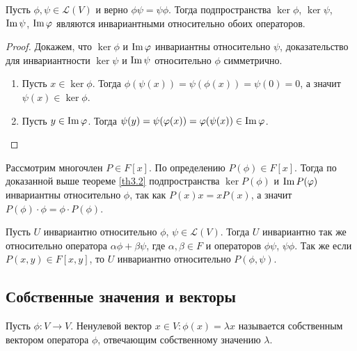 \begin{theorem}
    \label{th3.2}
    Пусть $\phi, \psi \in \mathcal{L}(V)$ и верно $\phi \psi = \psi \phi$. Тогда подпространства 
    $\ker \phi$, $\ker \psi$, $\operatorname{Im} \psi$, $\operatorname{Im} \varphi$ являются инвариантными 
    относительно обоих операторов.
\end{theorem}

\begin{proof}
    Докажем, что $\ker \phi$ и $\operatorname{Im} \varphi$ инвариантны относительно $\psi$, доказательство для 
    инвариантности $\ker \psi$ и $\operatorname{Im} \psi$ относительно $\phi$ симметрично.
    \begin{enumerate}
        \item Пусть $x \in \ker \phi$. Тогда $\phi(\psi(x)) = \psi(\phi(x)) = \psi(0) = 0$, 
        а значит $\psi(x) \in \ker \phi$.
        \item Пусть $y \in \operatorname{Im} \varphi$. Тогда $\psi(y) = \psi(\varphi(x)) = \varphi(\psi(x)) \in \operatorname{Im} \varphi$.
    \end{enumerate}
\end{proof}

\begin{note}
    Рассмотрим многочлен $P \in F[x]$. По определению $P(\phi) \in F[x]$. 
    Тогда по доказанной выше теореме \ref{th3.2} подпространства $\ker P(\phi)$ и $\operatorname{Im} P(\varphi)$ 
    инвариантны относительно $\phi$, так как $P(x) x = x P(x)$, 
    а значит $P(\phi) \cdot \phi = \phi \cdot P(\phi)$.
\end{note}

\begin{note}
    Пусть $U$ инвариантно относительно $\phi$, $\psi \in \mathcal{L}(V)$. 
    Тогда $U$ инвариантно так же относительно оператора $\alpha \phi + \beta \psi$, где 
    $\alpha, \beta \in F$ и операторов $\phi \psi$, $\psi \phi$. Так же если $P(x, y) \in F[x, y]$, 
    то $U$ инвариантно относительно $P(\phi, \psi)$.
\end{note}

\subsection{Собственные значения и векторы}

\begin{definition}
    Пусть $\phi: V \to V$. Ненулевой вектор 
    $x \in V: \phi(x) = \lambda x$ называется собственным вектором оператора $\phi$, 
    отвечающим собственному значению $\lambda$.
\end{definition}

